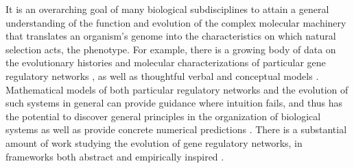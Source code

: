 \documentclass{article}
\newcommand{\1}{\mathbbm{1}}
\begin{document}
It is an overarching goal of many biological subdisciplines 
to attain a general understanding of the function and evolution of the 
complex molecular machinery that translates an organism's genome 
into the characteristics on which natural selection acts,
the phenotype.
For example, 
there is a growing body of data on the evolutionary histories and molecular characterizations of particular gene regulatory networks
\citep{jaeger2011gap, davidson2006gene, israel2016comparative}, 
as well as thoughtful verbal and conceptual models \citep{true2001developmental, weiss2000phenogenetic, edelman2001degeneracy, pavlicev2012model}. 
Mathematical models of both particular regulatory networks
and the evolution of such systems in general
can provide guidance where intuition fails,
and thus has the potential to discover general principles in the organization of biological systems 
as well as provide concrete numerical predictions \citep{servedio2014not}.
There is a substantial amount of work studying the evolution of gene regulatory networks, in frameworks 
both abstract \citep{wagner1994evolution, wagner1996does, siegal2002waddington, bergman2003evolutionary, draghi2015robustness} 
and empirically inspired
\citep{mjolsness1991connectionist, jaeger2004dynamic, vitaly1, crombach2016gap, wotton2015quantitative, chertkova2017insilico}.
\end{document}
